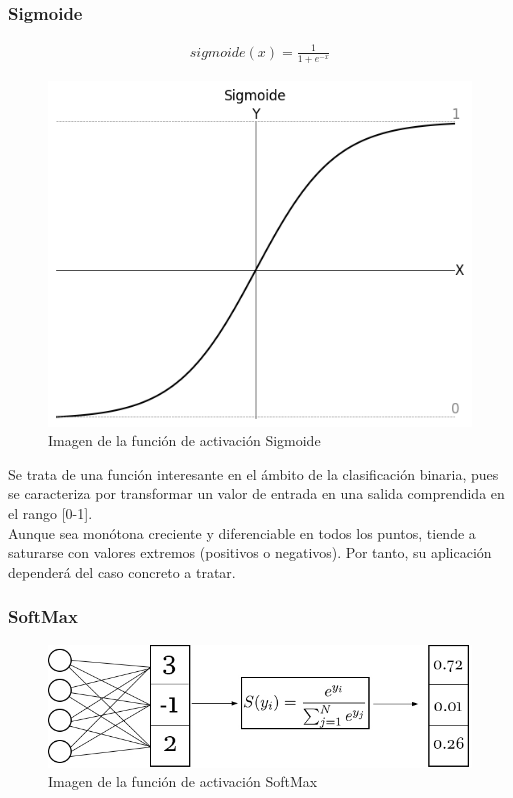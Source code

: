 \subsubsection{Sigmoide}

\begin{gather}
	sigmoide(x) = \frac{1}{1+e^{-x}}
\end{gather}

\begin{figure}[H]
	\centering
	\includegraphics[scale=0.45]{imagenes/sigmoide.jpg}  
	\caption{Imagen de la función de activación Sigmoide}
	\label{fig:Sigmoide}
\end{figure}

Se trata de una función interesante en el ámbito de la clasificación binaria, pues se caracteriza por transformar un valor de entrada en una salida comprendida en el rango [0-1]. \\
Aunque sea monótona creciente y diferenciable en todos los puntos, tiende a saturarse con valores extremos (positivos o negativos). Por tanto, su aplicación dependerá del caso concreto a tratar. \cite{Sigmoide}

\subsubsection{SoftMax}

\begin{figure}[H]
	\centering
	\includegraphics[scale=0.35]{imagenes/softmax.jpg}  
	\caption{Imagen de la función de activación SoftMax}
	\label{fig:SoftMax}
\end{figure}

